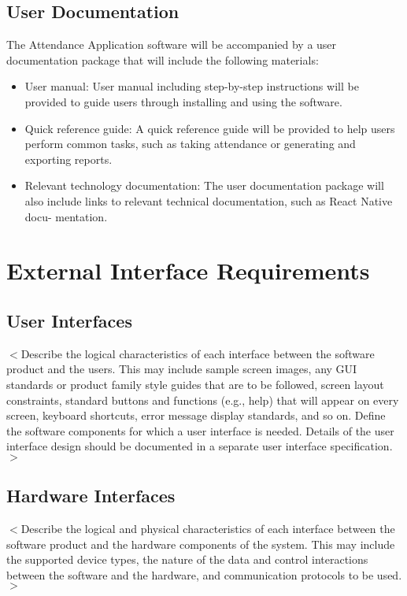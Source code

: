 \documentclass{scrreprt}
\begin{document}
\section{User Documentation}
The Attendance Application software will be accompanied by a user documentation package that will include the following materials:
\begin{itemize}
\item User manual: User manual including step-by-step instructions will be provided to guide users through
installing and using the software.
\item Quick reference guide: A quick reference guide will be provided to help users
perform common tasks, such as taking attendance or generating and exporting reports.
\item Relevant technology documentation: The user documentation package will also
include links to relevant technical documentation, such as React Native docu-
mentation.
\end{itemize}


\chapter{External Interface Requirements}

\section{User Interfaces}
$<$Describe the logical characteristics of each interface between the software 
product and the users. This may include sample screen images, any GUI standards 
or product family style guides that are to be followed, screen layout 
constraints, standard buttons and functions (e.g., help) that will appear on 
every screen, keyboard shortcuts, error message display standards, and so on.  
Define the software components for which a user interface is needed. Details of 
the user interface design should be documented in a separate user interface 
specification.$>$

\section{Hardware Interfaces}
$<$Describe the logical and physical characteristics of each interface between 
the software product and the hardware components of the system. This may include 
the supported device types, the nature of the data and control interactions 
between the software and the hardware, and communication protocols to be 
used.$>$
\end{document}
